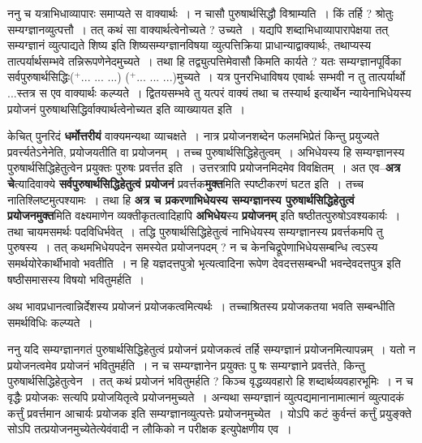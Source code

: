\documentclass[article,12pt,a4paper]{memoir}
\newcommand{\add}[1]{($^{+}$#1)}
\begin{document}
	  \pstart ननु च यत्राभिधाव्यापारः समाप्यते स वाक्यार्थः । न चासौ पुरुषार्थसिद्धौ विश्राम्यति । किं तर्हि ? श्रोतुः सम्यग्ज्ञानव्युत्पत्तौ । तत् कथं सा वाक्यार्थत्वेनोच्यते ? उच्यते । यद्यपि शब्दाभिधाव्यापारापेक्षया तत् सम्यग्ज्ञानं व्युत्पाद्यते शिष्य इति शिष्यसम्यग्ज्ञानविषया व्युत्पत्तिक्रिया प्राधान्याद्वाक्यार्थः, तथाप्यस्य तात्पर्यार्थसम्भवे तन्निरूपणेनेदमुच्यते । तथा हि तद्व्युत्पत्तिमेवासौ किमति कार्यते ? यतः सम्यग्ज्ञानपूर्विका सर्वपुरुषार्थसिद्धिः\add{... ... ...} \add{... ... ...}मुच्यते । यत्र पुनरभिधाविषय एवार्थः सम्भवी न तु तात्पर्यार्थो \leavevmode{}...स्तत्र स एव वाक्यार्थः कल्प्यते । द्वितयसम्भवे तु यत्परं वाक्यं तथा च तस्यार्थ इत्यार्थेन न्यायेनाभिधेयस्य प्रयोजनं पुरुषाथसिद्धिर्वाक्यार्थत्वेनोच्यत इति व्याख्यायत इति ।
	\pend
      

	  \pstart केचित् पुनरिदं \textbf{धर्मोत्तरीयं} वाक्यमन्यथा व्याचक्षते । नात्र प्रयोजनशब्देन फलमभिप्रेतं किन्तु प्रयुज्यते प्रवर्त्त्यतेऽनेनेति, प्रयोजयतीति वा प्रयोजनम् । तच्च पुरुषार्थसिद्धिहेतुत्वम् । अभिधेयस्य हि सम्यग्ज्ञानस्य पुरुषार्थसिद्धिहेतुत्वेन प्रयुक्तः पुरुषः प्रवर्त्तत इति । उत्तरत्रापि प्रयोजनमिदमेव विवक्षितम् । अत एव--\textbf{अत्र चे}त्यादिवाक्ये \textbf{सर्वपुरुषार्थसिद्धिहेतुत्वं प्रयोजनं} प्रवर्त्तक\textbf{मुक्त}मिति स्पष्टीकरणं घटत इति । तच्च नातिश्लिष्टमुत्पश्यामः । तथा हि \textbf{अत्र च प्रकरणाभिधेयस्य सम्यग्ज्ञानस्य पुरुषार्थसिद्धिहेतुत्वं प्रयोजनमुक्त}मिति वक्ष्यमाणेन व्यक्तीकृतत्वादिहापि \textbf{अभिधेय}स्य \textbf{प्रयोजनम्} इति षष्ठीतत्पुरुषोऽवश्यकार्यः । तथा चायमसमर्थः पदविधिर्भवेत् । तद्धि पुरुषार्थसिद्धिहेतुत्वं नाभिधेयस्य सम्यग्ज्ञानस्य प्रवर्त्तकमपि तु पुरुषस्य । तत् कथमभिधेयपदेन समस्येत प्रयोजनपदम् ? न च केनचिद्रूपेणाभिधेयसम्बन्धि  \leavevmode{} त्वऽस्य समर्थयोरेकार्थीभावो भवतीति । न हि यज्ञदत्तपुत्रो भृत्यत्वादिना रूपेण देवदत्तसम्बन्धी भवन्देवदत्तपुत्र इति षष्ठीसमासस्य विषयो भवितुमर्हति ।
	\pend
      

	  \pstart अथ भावप्रधानत्वान्निर्देशस्य प्रयोजनं प्रयोजकत्वमित्यर्थः । तच्चाश्रितस्य प्रयोजकतया भवति सम्बन्धीति समर्थविधिः कल्प्यते ।
	\pend
      

	  \pstart ननु यदि सम्यग्ज्ञानगतं पुरुषार्थसिद्धिहेतुत्वं प्रयोजनं प्रयोजकत्वं तर्हि सम्यग्ज्ञानं प्रयोजनमित्यापन्नम् । यतो न प्रयोजनत्वमेव प्रयोजनं भवितुमर्हति । न च सम्यग्ज्ञानेन प्रयुक्तः पु षः सम्यग्ज्ञाने प्रवर्त्तते, किन्तु पुरुषार्थसिद्धिहेतुत्वेन । तत् कथं प्रयोजनं भवितुमर्हति ? किञ्च वृद्धव्यवहारो हि शब्दार्थव्यवहारभूमिः । न च वृद्धैः प्रयोजकः सत्यपि प्रयोजयितृत्वे प्रयोजनमुच्यते । अन्यथा सम्यग्ज्ञानं व्युत्पद्यमानानामात्मानं व्युत्पादकं कर्त्तुं प्रवर्त्तमान आचार्यः प्रयोजक इति सम्यग्ज्ञानव्युत्पत्तेः प्रयोजनमुच्येत । योऽपि कटं कुर्वन्तं कर्त्तुं प्रयुङ्क्ते सोऽपि तत्प्रयोजनमुच्येतेत्येवंवादी न लौकिको न परीक्षक इत्युपेक्षणीय एव ।
	\pend
      
\end{document}
